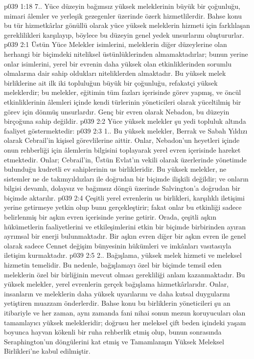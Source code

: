 \vs p039 1:18 7.. Yüce düzeyin bağımsız yüksek meleklerinin büyük bir çoğunluğu, mimari âlemler ve yerleşik gezegenler üzerinde özerk hizmetlilerdir. Bahse konu bu tür hizmetkârlar gönüllü olarak yüce yüksek meleklerin hizmeti için farklılaşan gereklilikleri karşılayıp, böylece bu düzeyin genel yedek unsurlarını oluştururlar.
\vs p039 2:1 Üstün Yüce Melekler isimlerini, meleklerin diğer düzeylerine olan herhangi bir biçimdeki niteliksel üstünlüklerinden almamaktadırlar; bunun yerine onlar isimlerini, yerel bir evrenin daha yüksek olan etkinliklerinden sorumlu olmalarına dair sahip oldukları niteliklerden almaktadır. Bu yüksek melek birliklerine ait ilk iki topluluğun büyük bir çoğunluğu, refakatçi yüksek meleklerdir; bu melekler, eğitimin tüm fazları içerisinde görev yapmış, ve öncül etkinliklerinin âlemleri içinde kendi türlerinin yöneticileri olarak yüceltilmiş bir görev için dönmüş unsurlardır. Genç bir evren olarak Nebadon, bu düzeyin birçoğuna sahip değildir.
\vs p039 2:2 Yüce yüksek melekler şu yedi topluluk altında faaliyet göstermektedir:
\vs p039 2:3 1.. Bu yüksek melekler, Berrak ve Sabah Yıldızı olarak Cebrail’in kişisel görevlilerine aittir. Onlar, Nebadon’un heyetleri içinde onun rehberliği için âlemlerin bilgisini toplayarak yerel evren içerisinde hareket etmektedir. Onlar; Cebrail’in, Üstün Evlat’ın vekili olarak üzerlerinde yönetimde bulunduğu kudretli ev sahiplerinin us birlikleridir. Bu yüksek melekler, ne sistemler ne de takımyıldızları ile doğrudan bir biçimde ilişkili değildir; ve onların bilgisi devamlı, dolaysız ve bağımsız döngü üzerinde Salvington’a doğrudan bir biçimde aktarılır.
\vs p039 2:4 Çeşitli yerel evrenlerin us birlikleri, karşılıklı iletişimi yerine getirmeye yetkin olup bunu gerçekleştirir; fakat onlar bu etkinliği sadece belirlenmiş bir aşkın evren içerisinde yerine getirir. Orada, çeşitli aşkın hükümetlerin faaliyetlerini ve etkileşimlerini etkin bir biçimde birbirinden ayıran ayrımsal bir enerji bulunmaktadır. Bir aşkın evren diğer bir aşkın evren ile genel olarak sadece Cennet değişim bünyesinin hükümleri ve imkânları vasıtasıyla iletişim kurmaktadır.
\vs p039 2:5 2.\bibnobreakspace {}. Bağışlama, yüksek melek hizmeti ve meleksel hizmetin temelidir. Bu nedenle, bağışlamayı özel bir biçimde temsil eden meleklerin özel bir birliğinin mevcut olması gerekliliği anlam kazanmaktadır. Bu yüksek melekler, yerel evrenlerin gerçek bağışlama hizmetkârlarıdır. Onlar, insanların ve meleklerin daha yüksek uyarılarını ve daha kutsal duygularını yetiştiren muazzam önderlerdir. Bahse konu bu birliklerin yöneticileri şu an itibariyle ve her zaman, aynı zamanda fani nihai sonun mezun koruyucuları olan tamamlayıcı yüksek melekleridir; doğrusu her meleksel çift beden içindeki yaşam boyunca hayvan kökenli bir ruha rehberlik etmiş olup, bunun sonrasında Seraphington’un döngülerini kat etmiş ve Tamamlanışın Yüksek Meleksel Birlikleri’ne kabul edilmiştir.
